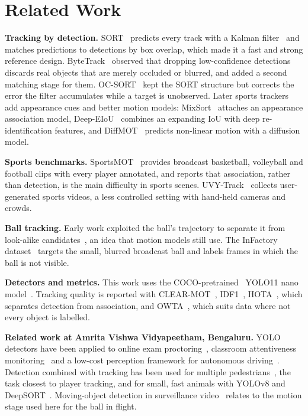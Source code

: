 \documentclass[11pt,a4paper]{article}
\begin{document}
\section{Related Work}
\textbf{Tracking by detection.} SORT~\cite{sort} predicts every track with a
Kalman filter~\cite{kalman} and matches predictions to detections by box overlap,
which made it a fast and strong reference design. ByteTrack~\cite{bytetrack}
observed that dropping low-confidence detections discards real objects that are
merely occluded or blurred, and added a second matching stage for them.
OC-SORT~\cite{ocsort} kept the SORT structure but corrects the error the filter
accumulates while a target is unobserved. Later sports trackers add appearance
cues and better motion models: MixSort~\cite{sportsmot} attaches an appearance
association model, Deep-EIoU~\cite{deepeiou} combines an expanding IoU with deep
re-identification features, and DiffMOT~\cite{diffmot} predicts non-linear motion
with a diffusion model.

\textbf{Sports benchmarks.} SportsMOT~\cite{sportsmot} provides broadcast
basketball, volleyball and football clips with every player annotated, and
reports that association, rather than detection, is the main difficulty in
sports scenes. UVY-Track~\cite{uvy} collects user-generated sports videos, a less
controlled setting with hand-held cameras and crowds.

\textbf{Ball tracking.} Early work exploited the ball's trajectory to separate it
from look-alike candidates~\cite{yu2006}, an idea that motion models still use.
The InFactory dataset~\cite{infactory} targets the small, blurred broadcast ball
and labels frames in which the ball is not visible.

\textbf{Detectors and metrics.} This work uses the COCO-pretrained~\cite{coco}
YOLO11 nano model~\cite{yolo11}. Tracking quality is reported with
CLEAR-MOT~\cite{clear}, IDF1~\cite{idf1}, HOTA~\cite{hota}, which separates
detection from association, and OWTA~\cite{owta}, which suits data where not
every object is labelled.

\textbf{Related work at Amrita Vishwa Vidyapeetham, Bengaluru.} YOLO detectors
have been applied to online exam proctoring~\cite{singh2024proctor}, classroom
attentiveness monitoring~\cite{nair2023attentive} and a low-cost perception
framework for autonomous driving~\cite{gopikiran2025driving}. Detection combined
with tracking has been used for multiple pedestrians~\cite{kumar2023pedestrian},
the task closest to player tracking, and for small, fast animals with YOLOv8 and
DeepSORT~\cite{peri2023animals}. Moving-object detection in surveillance
video~\cite{aarthi2016moving} relates to the motion stage used here for the ball
in flight.
\end{document}
